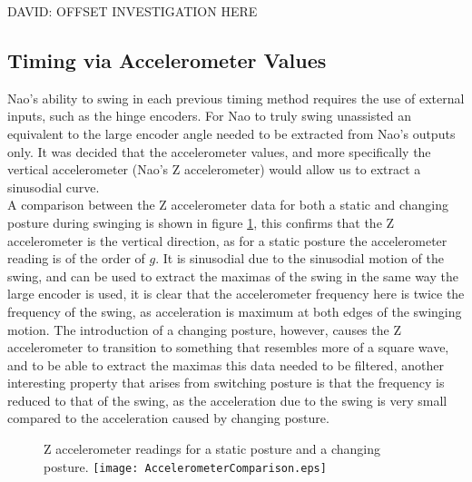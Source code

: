 \documentclass[11pt]{article}
\newcommand*\ruleline[1]{\par\noindent\raisebox{.8ex}{\makebox[\linewidth]{\hrulefill\hspace{1ex}\raisebox{-.8ex}{#1}\hspace{1ex}\hrulefill}}}
\begin{document}
DAVID: OFFSET INVESTIGATION HERE

\subsection{Timing via Accelerometer Values}
\ruleline{George Sheppard}
Nao's ability to swing in each previous timing method requires the use of external inputs, such as the hinge encoders. For Nao to truly swing unassisted an equivalent to the large encoder angle needed to be extracted from Nao's outputs only. It was decided that the accelerometer values, and more specifically the vertical accelerometer (Nao's Z accelerometer) would allow us to extract a sinusodial curve.\\

A comparison between the Z accelerometer data for both a static and changing posture during swinging is shown in figure \ref{fig:AccelerometerComparison}, this confirms that the Z accelerometer is the vertical direction, as for a static posture the accelerometer reading is of the order of $g$. It is sinusodial due to the sinusodial motion of the swing, and can be used to extract the maximas of the swing in the same way the large encoder is used, it is clear that the accelerometer frequency here is twice the frequency of the swing, as acceleration is maximum at both edges of the swinging motion. The introduction of a changing posture, however, causes the Z accelerometer to transition to something that resembles more of a square wave, and to be able to extract the maximas this data needed to be filtered, another interesting property that arises from switching posture is that the frequency is reduced to that of the swing, as the acceleration due to the swing is very small compared to the acceleration caused by changing posture.\\

    \begin{figure}[!htb]
        \centering
        \captionbox
             {Z accelerometer readings for a static posture and a changing posture.\label{fig:AccelerometerComparison}}
             {\texttt{[image: AccelerometerComparison.eps]}}
    \end{figure}
\end{document}
